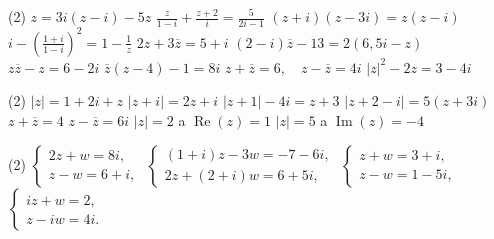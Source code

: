 \documentclass[12pt,a4paper]{article}
\begin{document}

\setcounter{section}{4}

\begin{exercise}
    \begin{tasks}(2)
        \task $z=3i(z-i)-5z$
        \task $\displaystyle \frac{z}{1-i}+\frac{z+2}{i}=\frac{5}{2i-1}$
        \task $(z+i)(z-3i)=z(z-i)$
        \task $\displaystyle i-\left(\frac{1+i}{1-i}\right)^2=1-\frac1z$
        \task $2z+3\overline z=5+i$
        \task $(2-i)\overline z-13=2(6{,}5i-z)$
        \task $z\overline z-z=6-2i$
        \task $\overline z(z-4)-1=8i$
        \task $z+\overline z=6,\quad z-\overline z=4i$
        \task $|z|^2-2z=3-4i$
    \end{tasks}
\end{exercise}


\begin{exercise}
        \begin{tasks}(2)
            \task $|z|=1+2i+z$
            \task $|z+i|=2z+i$
            \task $|z+1|-4i=z+3$
            \task $|z+2-i|=5(z+3i)$
            \task $z+\overline z=4$
            \task $z-\overline z=6i$
            \task $|z|=2$ a $\operatorname{Re}(z)=1$
            \task $|z|=5$ a $\operatorname{Im}(z)=-4$
        \end{tasks}
\end{exercise}


\begin{exercise}
    \begin{tasks}(2)
        \task $\begin{cases}2z+w=8i,\\z-w=6+i,\end{cases}$
        \task $\begin{cases}(1+i)z-3w=-7-6i,\\2z+(2+i)w=6+5i,\end{cases}$
        \task $\begin{cases}z+w=3+i,\\z-w=1-5i,\end{cases}$
        \task $\begin{cases}iz+w=2,\\z-iw=4i.\end{cases}$
    \end{tasks}
\end{exercise}
\end{document}

